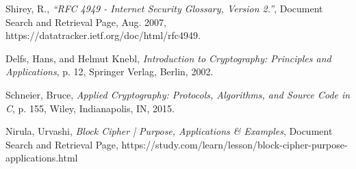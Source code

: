 \begin{thebibliography}{9}

  Shirey, R.,
  \emph{“RFC 4949 - Internet Security Glossary, Version 2.”},
  Document Search and Retrieval Page,
  Aug. 2007,
  https://datatracker.ietf.org/doc/html/rfc4949. 

  Delfs, Hans, and Helmut Knebl,
  \emph{Introduction to Cryptography: Principles and Applications},
  p. 12, Springer Verlag, Berlin,
  2002.
  
  Schneier, Bruce,
  \emph{Applied Cryptography: Protocols, Algorithms, and Source Code in C},
  p. 155, Wiley, Indianapolis, IN,
  2015.
  

  Nirula, Urvashi,
  \emph{Block Cipher | Purpose, Applications \& Examples},
  Document Search and Retrieval Page,
  https://study.com/learn/lesson/block-cipher-purpose-applications.html
      
  
%  
%
\end{thebibliography}